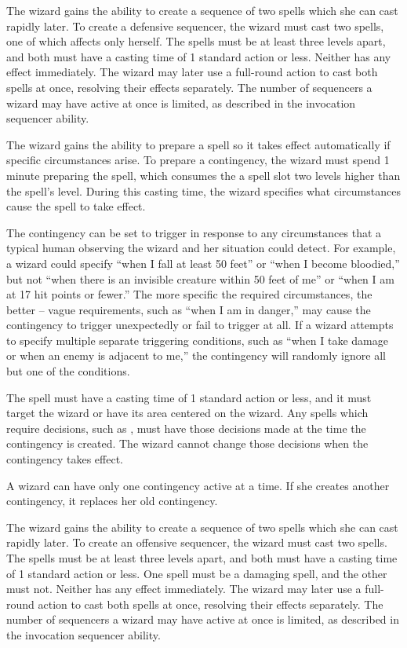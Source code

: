 The wizard gains the ability to create a sequence of two spells which she can cast rapidly later.
To create a defensive sequencer, the wizard must cast two spells, one of which affects only herself.
The spells must be at least three levels apart, and both must have a casting time of 1 standard action or less.
Neither has any effect immediately.
The wizard may later use a full-round action to cast both spells at once, resolving their effects separately.
The number of sequencers a wizard may have active at once is limited, as described in the invocation sequencer ability.

The wizard gains the ability to prepare a spell so it takes effect automatically if specific circumstances arise.
To prepare a contingency, the wizard must spend 1 minute preparing the spell, which consumes the a spell slot two levels higher than the spell's level.
During this casting time, the wizard specifies what circumstances cause the spell to take effect.

The contingency can be set to trigger in response to any circumstances that a typical human observing the wizard and her situation could detect.
For example, a wizard could specify ``when I fall at least 50 feet'' or ``when I become bloodied,'' but not ``when there is an invisible creature within 50 feet of me'' or ``when I am at 17 hit points or fewer.'' The more specific the required circumstances, the better -- vague requirements, such as ``when I am in danger,'' may cause the contingency to trigger unexpectedly or fail to trigger at all.
If a wizard attempts to specify multiple separate triggering conditions, such as ``when I take damage or when an enemy is adjacent to me,'' the contingency will randomly ignore all but one of the conditions.

The spell must have a casting time of 1 standard action or less, and it must target the wizard or have its area centered on the wizard.
Any spells which require decisions, such as , must have those decisions made at the time the contingency is created.
The wizard cannot change those decisions when the contingency takes effect.

A wizard can have only one contingency active at a time.
If she creates another contingency, it replaces her old contingency.

The wizard gains the ability to create a sequence of two spells which she can cast rapidly later.
To create an offensive sequencer, the wizard must cast two spells.
The spells must be at least three levels apart, and both must have a casting time of 1 standard action or less.
One spell must be a damaging spell, and the other must not.
Neither has any effect immediately.
The wizard may later use a full-round action to cast both spells at once, resolving their effects separately.
The number of sequencers a wizard may have active at once is limited, as described in the invocation sequencer ability.

